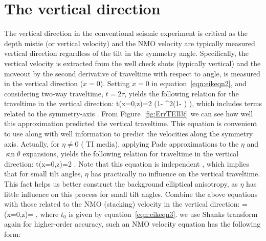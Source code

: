 \section{The vertical direction}

The vertical direction in the conventional seismic experiment
 is critical as the depth mistie (or vertical velocity) and the NMO velocity are typically measured   vertical direction
regardless of the tilt in the symmetry angle. Specifically, the vertical velocity is extracted from the well check shots (typically vertical) and the moveout
 by the second derivative of traveltime with respect to  angle, is
measured in the vertical direction ($x=0$). 
Setting $x=0$ in equation~\ref{eqn:eikeqn2}, and considering
 two-way traveltime, $t=2\tau$,
 yields the following relation for the traveltime in the vertical direction:
\beqa
t(x=0,z)=2  \left(1- \sin^{2}\theta \left(1- \right) \right),
\label{eqn:eikeqn3}
\eeqa
which  includes terms related to the symmetry-axis . From Figure~\ref{fig:ErrTEll3f} we can see how well this
approximation predicted the vertical traveltime. This equation is convenient to use along with
well information to predict the velocities along the symmetry
axis. Actually, for $\eta \ne 0$  ( TI media), 
applying Pade approximations \cite[]{Bender} to the $\eta$ and $\sin\theta$ expansions, yields the following relation for traveltime in the vertical direction:
\beqa
t(x=0,z)=2  .
\label{eqn:eikeqn4}
\eeqa
Note that this equation is independent , which implies that for small tilt angles, $\eta$ has practically no influence on the 
vertical traveltime.
This fact helps us  better construct the background
elliptical anisotropy, as $\eta$ has little influence on this process
for small tilt angles. Combine the above equations with those related to the 
NMO (stacking) velocity in the vertical direction:
\beqa
{} =  (x=0,z)= 
	,
\label{eqn:eikeqn5}
\eeqa
where $t_0$ is given by equation~\ref{eqn:eikeqn3}.
  we use Shanks transform again for higher-order accuracy, such an NMO velocity equation has the following form:

